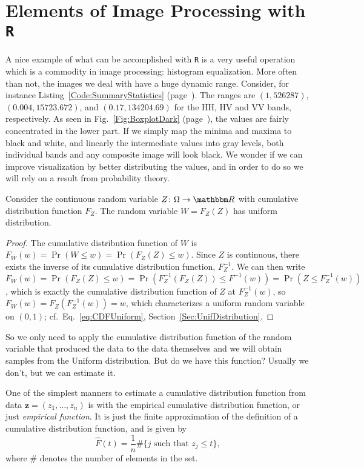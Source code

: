 \chapter{Elements of Image Processing with \texttt{R}}\label{Chapter:ElementsR}

A nice example of what can be accomplished with \texttt R is a very useful operation which is a commodity in image processing: histogram equalization.
More often than not, the images we deal with have a huge dynamic range.
Consider, for instance Listing~\ref{Code:SummaryStatistics} (page~\pageref{Code:SummaryStatistics}).
The ranges are 
$(1,526287)$, $(0.004,15723.672) $, and $(0.17,134204.69)$ for the HH, HV and VV bands, respectively.
As seen in Fig.~\ref{Fig:BoxplotDark} (page~\pageref{Fig:BoxplotDark}), the values are fairly concentrated in the lower part.
If we simply map the minima and maxima to black and white, and linearly the intermediate values into gray levels, both individual bands and any composite image will look black.
We wonder if we can improve visualization by better distributing the values, and in order to do so we will rely on a result from probability theory.

\begin{theorem}\label{Theo:FZ}
Consider the continuous random variable $Z\colon \Omega\to\mathbbm R$ with cumulative distribution function $F_Z$.
The random variable $W=F_Z(Z)$ has uniform distribution.
\end{theorem}

\begin{proof}
The cumulative distribution function of $W$ is $F_W(w)=\Pr(W\leq w)=\Pr(F_Z(Z)\leq w)$.
Since $Z$ is continuous, there exists the inverse of its cumulative distribution function, $F^{-1}_Z$.
We can then write 
$F_W(w)=\Pr(F_Z(Z)\leq w) = \Pr(F^{-1}_Z(F_Z(Z)) \leq F^{-1}(w)) = \Pr(Z\leq F^{-1}_Z(w))$, 
which is exactly the cumulative distribution function of $Z$ at $F^{-1}_Z(w)$, so $F_W(w)=F_Z(F^{-1}_Z(w))=w$, which characterizes a uniform random variable on $(0,1)$; cf.\ Eq.~\eqref{eq:CDFUniform}, Section~\ref{Sec:UnifDistribution}.
\end{proof}

So we only need to apply the cumulative distribution function of the random variable that produced the data to the data themselves and we will obtain samples from the Uniform distribution.
But do we have this function?
Usually we don't, but we can estimate it.

One of the simplest manners to estimate a cumulative distribution function from data $\bm z=(z_1,\dots,z_n)$ is with the empirical cumulative distribution function, or just \textit{empirical function}.
It is just the finite approximation of the definition of a cumulative distribution function, and is given by
\begin{equation}
\widehat{F}(t) = \frac1n \#\{j \text{ such that } z_j\leq t\} ,
\end{equation}
where $\#$ denotes the number of elements in the set.

